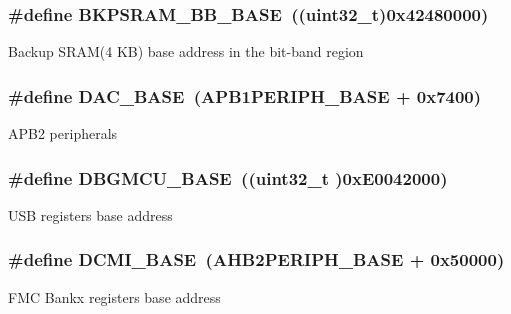 \subsubsection[{\texorpdfstring{B\+K\+P\+S\+R\+A\+M\+\_\+\+B\+B\+\_\+\+B\+A\+SE}{BKPSRAM_BB_BASE}}]{\setlength{\rightskip}{0pt plus 5cm}\#define B\+K\+P\+S\+R\+A\+M\+\_\+\+B\+B\+\_\+\+B\+A\+SE~((uint32\+\_\+t)0x42480000)}\hypertarget{group___peripheral__memory__map_gaee19a30c9fa326bb10b547e4eaf4e250}{}\label{group___peripheral__memory__map_gaee19a30c9fa326bb10b547e4eaf4e250}
Backup S\+R\+A\+M(4 K\+B) base address in the bit-\/band region 
\subsubsection[{\texorpdfstring{D\+A\+C\+\_\+\+B\+A\+SE}{DAC_BASE}}]{\setlength{\rightskip}{0pt plus 5cm}\#define D\+A\+C\+\_\+\+B\+A\+SE~(A\+P\+B1\+P\+E\+R\+I\+P\+H\+\_\+\+B\+A\+SE + 0x7400)}\hypertarget{group___peripheral__memory__map_gad18d0b914c7f68cecbee1a2d23a67d38}{}\label{group___peripheral__memory__map_gad18d0b914c7f68cecbee1a2d23a67d38}
A\+P\+B2 peripherals 
\subsubsection[{\texorpdfstring{D\+B\+G\+M\+C\+U\+\_\+\+B\+A\+SE}{DBGMCU_BASE}}]{\setlength{\rightskip}{0pt plus 5cm}\#define D\+B\+G\+M\+C\+U\+\_\+\+B\+A\+SE~((uint32\+\_\+t )0x\+E0042000)}\hypertarget{group___peripheral__memory__map_ga4adaf4fd82ccc3a538f1f27a70cdbbef}{}\label{group___peripheral__memory__map_ga4adaf4fd82ccc3a538f1f27a70cdbbef}
U\+SB registers base address 
\subsubsection[{\texorpdfstring{D\+C\+M\+I\+\_\+\+B\+A\+SE}{DCMI_BASE}}]{\setlength{\rightskip}{0pt plus 5cm}\#define D\+C\+M\+I\+\_\+\+B\+A\+SE~({\bf A\+H\+B2\+P\+E\+R\+I\+P\+H\+\_\+\+B\+A\+SE} + 0x50000)}\hypertarget{group___peripheral__memory__map_ga55b794507e021135486de57129a2505c}{}\label{group___peripheral__memory__map_ga55b794507e021135486de57129a2505c}
F\+MC Bankx registers base address 

